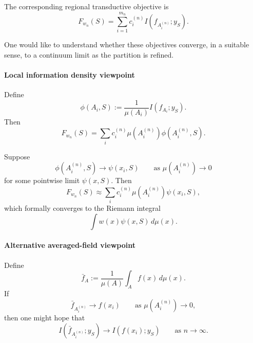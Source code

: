 The corresponding regional transductive objective is
\begin{equation*}
F_{w_n}(S)
=
\sum_{i=1}^{m_n}
c_i^{(n)}
I(f_{A_i^{(n)}};y_S).
\end{equation*}

One would like to understand whether these objectives converge, in a suitable sense, to a continuum limit as the partition is refined.

\paragraph{Local information density viewpoint}

Define
\begin{equation*}
\phi(A_i,S)
:=
\frac{1}{\mu(A_i)}
I(f_{A_i};y_S).
\end{equation*}
Then
\begin{equation*}
F_{w_n}(S)
=
\sum_i
c_i^{(n)}
\mu(A_i^{(n)})
\phi(A_i^{(n)},S).
\end{equation*}

Suppose
\begin{equation*}
\phi(A_i^{(n)},S)
\to
\psi(x_i,S)
\qquad
\text{as }
\mu(A_i^{(n)})\to 0
\end{equation*}
for some pointwise limit $\psi(x,S)$. Then
\begin{equation*}
F_{w_n}(S)
\approx
\sum_i
c_i^{(n)}
\mu(A_i^{(n)})
\psi(x_i,S),
\end{equation*}
which formally converges to the Riemann integral
\begin{equation*}
\int
w(x)\psi(x,S)\,d\mu(x).
\end{equation*}

\paragraph{Alternative averaged-field viewpoint}

Define
\begin{equation*}
\bar f_A
:=
\frac{1}{\mu(A)}
\int_A
f(x)\,d\mu(x).
\end{equation*}
If
\begin{equation*}
\bar f_{A_i^{(n)}}
\to
f(x_i)
\qquad
\text{as }
\mu(A_i^{(n)})\to 0,
\end{equation*}
then one might hope that
\begin{equation*}
I(\bar f_{A_i^{(n)}};y_S)
\to
I(f(x_i);y_S)
\qquad
\text{as }
n\to\infty.
\end{equation*}

